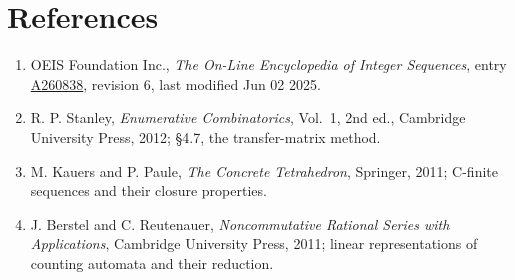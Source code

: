 \documentclass[11pt]{article}
\theoremstyle{definition}
\begin{document}
\section{References}

\begin{enumerate}

\item OEIS Foundation Inc., \emph{The On-Line Encyclopedia of Integer Sequences}, entry \href{https://oeis.org/A260838}{A260838}, revision 6, last modified Jun 02 2025.

\item R. P. Stanley, \emph{Enumerative Combinatorics}, Vol.~1, 2nd ed., Cambridge University Press, 2012; \S4.7, the transfer-matrix method.

\item M. Kauers and P. Paule, \emph{The Concrete Tetrahedron}, Springer, 2011; C-finite sequences and their closure properties.

\item J. Berstel and C. Reutenauer, \emph{Noncommutative Rational Series with Applications}, Cambridge University Press, 2011; linear representations of counting automata and their reduction.

\end{enumerate}
\end{document}
